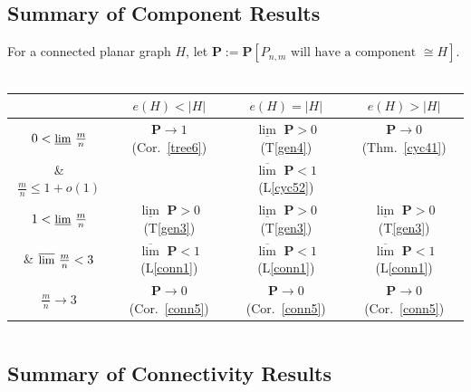 \documentclass{article}
\newtheorem{Proof of Theorem}{Proof of Theorem}
\begin{document}
\newpage
\label{main cpt}
\subsection*{Summary of Component Results} 





For a connected planar graph $H$,
let $\mathbf{P} := \mathbf{P}[P_{n,m} \textrm{ will have a component } \cong H]$. \\
\\ 
\begin{tabular}{c|c|c|c}
&
$e(H)<|H|$ &
$e(H)=|H|$ &
$e(H) > |H|$ \\
\hline
$0 < \textrm{\small{$\underline{\lim}$} } \frac{m}{n}$ &
$\mathbf{P} \to 1$ (Cor.~\ref{tree6}) &
\small{$\underline{\lim}$} $\mathbf{P} > 0$ (T\ref{gen4}) &
$\mathbf{P} \to 0$ (Thm.~\ref{cyc41}) \\
\& $\frac{m}{n} \leq 1+o(1)$ &
&
\small{$\overline{\lim}$} $\mathbf{P} < 1$ (L\ref{cyc52}) &
\\
\hline
$1 < \textrm{\small{$\underline{\lim}$} } \frac{m}{n}$ &
\small{$\underline{\lim}$} $\mathbf{P} > 0$ (T\ref{gen3}) &
\small{$\underline{\lim}$} $\mathbf{P} > 0$ (T\ref{gen3}) &
\small{$\underline{\lim}$} $\mathbf{P} > 0$ (T\ref{gen3}) \\
\& $\textrm{\small{$\overline{\lim}$} } \frac{m}{n} < 3$ &
\small{$\overline{\lim}$} $\mathbf{P} < 1$ (L\ref{conn1}) &
\small{$\overline{\lim}$} $\mathbf{P} < 1$ (L\ref{conn1}) &
\small{$\overline{\lim}$} $\mathbf{P} < 1$ (L\ref{conn1}) \\
\hline
$\frac{m}{n} \to 3$ &
$\mathbf{P} \to 0$ (Cor.~\ref{conn5}) &
$\mathbf{P} \to 0$ (Cor.~\ref{conn5}) &
$\mathbf{P} \to 0$ (Cor.~\ref{conn5})
\end{tabular}
\begin{displaymath}
\end{displaymath} 





\subsection*{Summary of Connectivity Results}
\end{document}
